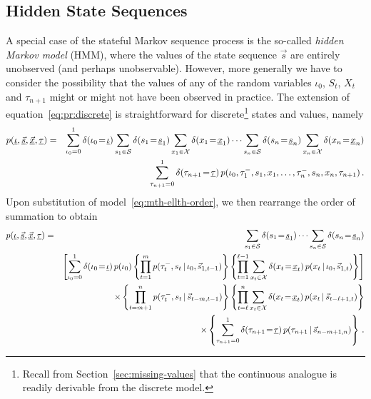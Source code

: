 \documentclass[a4paper]{article}
\newcommand{\ui}{\underline{\iota}}
\newcommand{\ut}{\underline{\tau}}
\newcommand{\tm}{\tau^{-}}
\newcommand{\vs}{\vec{s}}
\newcommand{\uvs}{\underline{\vs}}
\newcommand{\vx}{\vec{x}}
\newcommand{\uvx}{\underline{\vx}}
\newcommand{\ux}{\underline{x}}
\newcommand{\us}{\underline{s}}
\begin{document}
\subsection{Hidden State Sequences}\label{sec:hidden-state}

A special case of the stateful Markov sequence process is the so-called {\em hidden Markov model} (HMM), where the values of the state sequence $\vs$ are
entirely unobserved (and perhaps unobservable). However, more generally we have to consider the possibility that the values of any of the random variables 
$\iota_0$, $S_t$, $X_t$ and $\tau_{n+1}$ might or might not have been observed in practice. The extension of equation~\eqref{eq:pr:discrete} is straightforward
for discrete\footnote{Recall from Section~\ref{sec:missing-values} that the continuous analogue is readily derivable from the discrete model.} states and values, namely
\begin{eqnarray}
p(\ui,\uvs,\uvx,\ut) 
& = & 
\sum_{\iota_0=0}^{1}\delta(\iota_0\!=\!\ui)
\sum_{s_1\in{\cal S}} \delta(s_1\!=\!\us_1)
\sum_{x_1\in{\cal X}} \delta(x_1\!=\!\ux_1)
\cdots\sum_{s_n\in{\cal S}} \delta(s_n\!=\!\us_n)
\sum_{x_n\in{\cal X}} \delta(x_n\!=\!\ux_n)
\nonumber\\&&
\,\sum_{\tau_{n+1}=0}^{1}\delta(\tau_{n+1}\!=\!\ut)
\,p(\iota_0,\tm_1,s_1,x_1,\ldots,\tm_n,s_n,x_n,\tau_{n+1})\,.
\label{eq:pr:discrete:state-value}
\end{eqnarray}
Upon substitution of model~\eqref{eq:mth-ellth-order}, we then rearrange the order of summation to obtain
\begin{eqnarray}
p(\ui,\uvs,\uvx,\ut) 
& = & 
\sum_{s_1\in{\cal S}} \delta(s_1\!=\!\us_1)
\cdots\sum_{s_n\in{\cal S}} \delta(s_n\!=\!\us_n)
\nonumber\\&&
\left[
\sum_{\iota_0=0}^{1}\delta(\iota_0\!=\!\ui)
\,p(\iota_0)\left\{\prod_{t=1}^{m}p(\tm_t,s_t\,|\,\iota_0,\vs_{1,t-1})
\right\}
\left\{\prod_{t=1}^{\ell-1}
\sum_{x_t\in{\cal X}} \delta(x_t\!=\!\ux_t)\,
p(x_t\,|\,\iota_0,\vs_{1,t})
\right\}\right]
\nonumber\\&&\times
\left\{\prod_{t=m+1}^{n}p(\tm_t,s_t\,|\,\vs_{t-m,t-1})\right\}
\left\{
\prod_{t=\ell}^{n}
\sum_{x_t\in{\cal X}} \delta(x_t\!=\!\ux_t)\,
p(x_t\,|\,\vs_{t-\ell+1,t})
\right\}
\nonumber\\&&\times
\left\{
\sum_{\tau_{n+1}=0}^{1}\delta(\tau_{n+1}\!=\!\ut)\,
p(\tau_{n+1}\,|\,\vs_{n-m+1,n})
\right\}\,.
\label{eq:partial-m-ell}
\end{eqnarray}
\end{document}
